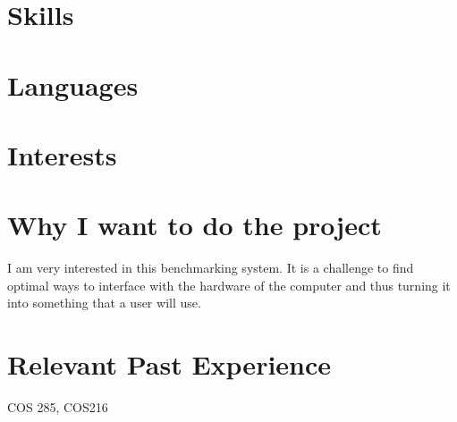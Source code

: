 \documentclass[11pt,a4paper,sans]{moderncv} %
\begin{document}

\section{Skills }




\section{Languages}



\section{Interests}
\renewcommand{\listitemsymbol}{-~} %

\section{Why I want to do the project}
I am very interested in this benchmarking system. It is a challenge to find optimal ways to interface with the hardware of the computer and thus turning it into something that a user will use.
\section{Relevant Past Experience}
COS 285, COS216
\end{document}
